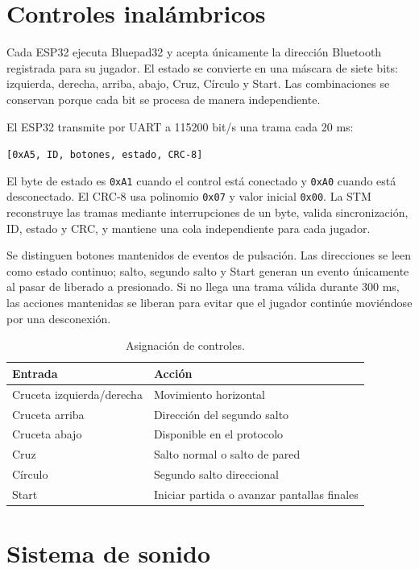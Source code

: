 \documentclass[11pt,letterpaper]{article}
\begin{document}
\section{Controles inalámbricos}

Cada ESP32 ejecuta Bluepad32 y acepta únicamente la dirección Bluetooth registrada
para su jugador. El estado se convierte en una máscara de siete bits: izquierda,
derecha, arriba, abajo, Cruz, Círculo y Start. Las combinaciones se conservan porque
cada bit se procesa de manera independiente.

El ESP32 transmite por UART a 115200 bit/s una trama cada 20 ms:

\begin{center}
\texttt{[0xA5, ID, botones, estado, CRC-8]}
\end{center}

El byte de estado es \texttt{0xA1} cuando el control está conectado y
\texttt{0xA0} cuando está desconectado. El CRC-8 usa polinomio \texttt{0x07} y valor
inicial \texttt{0x00}. La STM reconstruye las tramas mediante interrupciones de un
byte, valida sincronización, ID, estado y CRC, y mantiene una cola independiente para
cada jugador.

Se distinguen botones mantenidos de eventos de pulsación. Las direcciones se leen
como estado continuo; salto, segundo salto y Start generan un evento únicamente al
pasar de liberado a presionado. Si no llega una trama válida durante 300 ms, las
acciones mantenidas se liberan para evitar que el jugador continúe moviéndose por una
desconexión.

\begin{table}[h]
\centering
\caption{Asignación de controles.}
\begin{tabular}{@{}ll@{}}
\toprule
\textbf{Entrada} & \textbf{Acción} \\
\midrule
Cruceta izquierda/derecha & Movimiento horizontal \\
Cruceta arriba & Dirección del segundo salto \\
Cruceta abajo & Disponible en el protocolo \\
Cruz & Salto normal o salto de pared \\
Círculo & Segundo salto direccional \\
Start & Iniciar partida o avanzar pantallas finales \\
\bottomrule
\end{tabular}
\end{table}

\section{Sistema de sonido}
\end{document}
